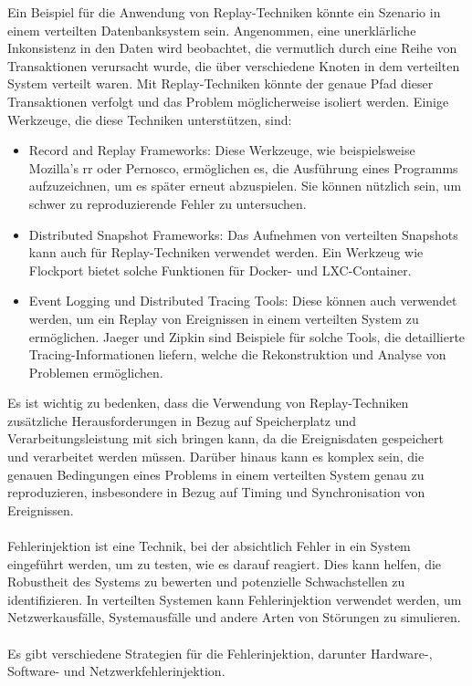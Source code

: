Ein Beispiel für die Anwendung von Replay-Techniken könnte ein Szenario in einem verteilten Datenbanksystem sein. Angenommen, eine unerklärliche Inkonsistenz in den Daten wird beobachtet, die vermutlich durch eine Reihe von Transaktionen verursacht wurde, die über verschiedene Knoten in dem verteilten System verteilt waren. Mit Replay-Techniken könnte der genaue Pfad dieser Transaktionen verfolgt und das Problem möglicherweise isoliert werden.
Einige Werkzeuge, die diese Techniken unterstützen, sind:
\begin{itemize}
\item Record and Replay Frameworks: Diese Werkzeuge, wie beispielsweise Mozilla's rr oder Pernosco, ermöglichen es, die Ausführung eines Programms aufzuzeichnen, um es später erneut abzuspielen. Sie können nützlich sein, um schwer zu reproduzierende Fehler zu untersuchen.
\item Distributed Snapshot Frameworks: Das Aufnehmen von verteilten Snapshots kann auch für Replay-Techniken verwendet werden. Ein Werkzeug wie Flockport bietet solche Funktionen für Docker- und LXC-Container.
\item Event Logging und Distributed Tracing Tools: Diese können auch verwendet werden, um ein Replay von Ereignissen in einem verteilten System zu ermöglichen. Jaeger und Zipkin sind Beispiele für solche Tools, die detaillierte Tracing-Informationen liefern, welche die Rekonstruktion und Analyse von Problemen ermöglichen.
\end{itemize}
Es ist wichtig zu bedenken, dass die Verwendung von Replay-Techniken zusätzliche Herausforderungen in Bezug auf Speicherplatz und Verarbeitungsleistung mit sich bringen kann, da die Ereignisdaten gespeichert und verarbeitet werden müssen. Darüber hinaus kann es komplex sein, die genauen Bedingungen eines Problems in einem verteilten System genau zu reproduzieren, insbesondere in Bezug auf Timing und Synchronisation von Ereignissen.
\\\\
Fehlerinjektion ist eine Technik, bei der absichtlich Fehler in ein System eingeführt werden, um zu testen, wie es darauf reagiert. Dies kann helfen, die Robustheit des Systems zu bewerten und potenzielle Schwachstellen zu identifizieren. In verteilten Systemen kann Fehlerinjektion verwendet werden, um Netzwerkausfälle, Systemausfälle und andere Arten von Störungen zu simulieren.
\\\\
Es gibt verschiedene Strategien für die Fehlerinjektion, darunter Hardware-, Software- und Netzwerkfehlerinjektion.
